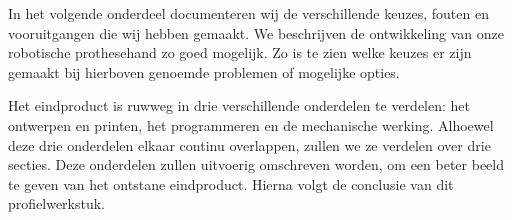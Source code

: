 In het volgende onderdeel documenteren wij de verschillende keuzes,
fouten en vooruitgangen die wij hebben gemaakt. We beschrijven de
ontwikkeling van onze robotische prothesehand zo goed mogelijk. Zo is te
zien welke keuzes er zijn gemaakt bij hierboven genoemde problemen of
mogelijke opties.

Het eindproduct is ruwweg in drie verschillende onderdelen te verdelen:
het ontwerpen en printen, het programmeren en de mechanische werking.
Alhoewel deze drie onderdelen elkaar continu overlappen, zullen we ze
verdelen over drie secties. Deze onderdelen zullen uitvoerig omschreven
worden, om een beter beeld te geven van het ontstane eindproduct. Hierna
volgt de conclusie van dit profielwerkstuk.
